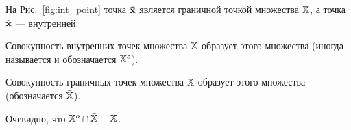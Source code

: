 На Рис.~\ref{fig:int_point} точка $\mathbf{\bar x}$ является граничной
точкой множества $\mathbb{X}$, а точка $\mathbf{\tilde x}$ --- внутренней.



Совокупность внутренних точек множества $\mathbb{X}$ образует
 этого множества (иногда называется  и обозначается $\mathbb{X}^o$).

Совокупность граничных точек множества $\mathbb{X}$ образует
 этого множества (обозначается $\mathbb{\bar X}$).

Очевидно, что $\mathbb{X}^o \cap \mathbb{\bar X} = \mathbb{X}$.





